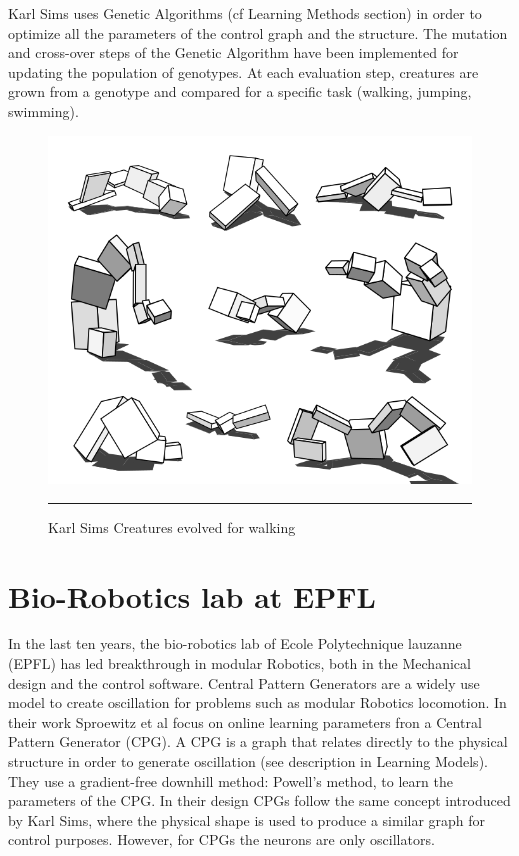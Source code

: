 \newpage
Karl Sims uses Genetic Algorithms (cf Learning Methods section) in order to optimize all the parameters of the control graph and the structure. The mutation and cross-over steps of the Genetic Algorithm have been implemented for updating the population of genotypes. At each evaluation step, creatures are grown from a genotype and compared for a specific task (walking, jumping, swimming). 

\begin{figure}[htbp]
    \centering
    \includegraphics[scale=0.3]{Figures/evolved_creature.png}
    \rule{35em}{0.5pt}
    \caption[Karl Sims Creatures evolved for walking]{Karl Sims Creatures evolved for walking}
    \label{fig:evolved_creature}
\end{figure}


\newpage
\section{Bio-Robotics lab at EPFL}

In the last ten years, the bio-robotics lab of Ecole Polytechnique lauzanne (EPFL) has led breakthrough in modular Robotics, both in the Mechanical design and the control software. 
Central Pattern Generators are a widely use model to create oscillation for problems such as modular Robotics locomotion. In their work Sproewitz et al \cite{sproewitz} focus on online learning parameters fron a Central Pattern Generator (CPG). A CPG is a graph that relates directly to the physical structure in order to generate oscillation (see description in Learning Models). They use a gradient-free downhill method: Powell's method, to learn the parameters of the CPG. In their design CPGs follow the same concept introduced by Karl Sims, where the physical shape is used to produce a similar graph for control purposes. However, for CPGs the neurons are only oscillators. 


